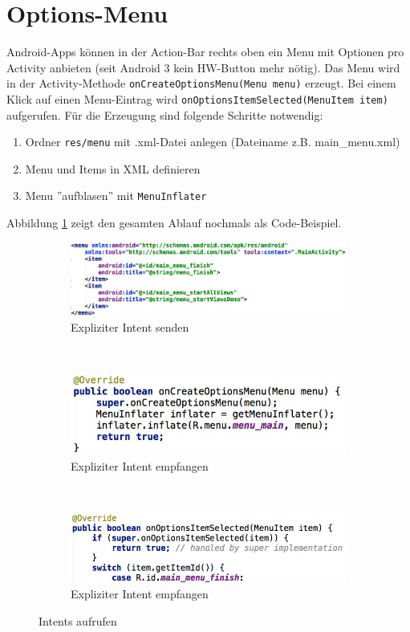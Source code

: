 \section{Options-Menu}

Android-Apps können in der Action-Bar rechts oben ein Menu mit Optionen pro Activity anbieten (seit Android 3 kein HW-Button mehr nötig). Das Menu wird in der Activity-Methode \texttt{onCreateOptionsMenu(Menu menu)} erzeugt. Bei einem Klick auf einen Menu-Eintrag wird \texttt{onOptionsItemSelected(MenuItem item)} aufgerufen. Für die Erzeugung sind folgende Schritte notwendig:
\begin{enumerate}
	\item Ordner \texttt{res/menu} mit .xml-Datei anlegen (Dateiname z.B. main\_menu.xml)
	\item Menu und Items in XML definieren
	\item Menu ''aufblasen'' mit \texttt{MenuInflater}
\end{enumerate}
Abbildung \ref{fig:option-menu} zeigt den gesamten Ablauf nochmals als Code-Beispiel.
\begin{figure}
	\centering
	\begin{subfigure}[b]{0.3\textwidth}
		\includegraphics[width=\textwidth]{fig/option-menu-xml}
		\caption{Expliziter Intent senden}
	\end{subfigure}
	~
	\begin{subfigure}[b]{0.3\textwidth}
		\includegraphics[width=\textwidth]{fig/option-menu-create}
		\caption{Expliziter Intent empfangen}
	\end{subfigure}
	~
	\begin{subfigure}[b]{0.3\textwidth}
		\includegraphics[width=\textwidth]{fig/option-menu-event}
		\caption{Expliziter Intent empfangen}
	\end{subfigure}
	\caption{Intents aufrufen}
	\label{fig:option-menu}
\end{figure}

